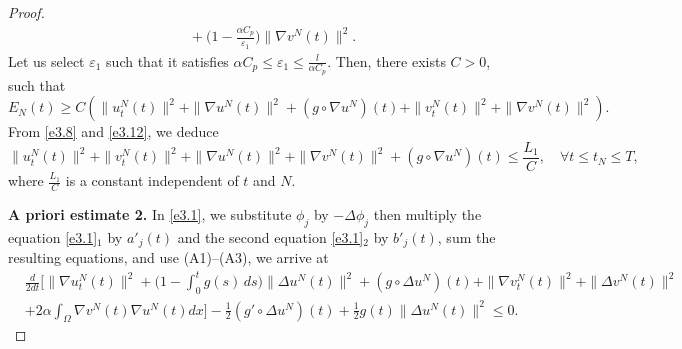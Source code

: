 \documentclass[11pt]{article}
\numberwithin{equation}{section}
\begin{document}
\begin{proof}
\begin{equation}
\begin{aligned}
 &\quad +\Big( 1-\frac{\alpha C_p}{\varepsilon_{1}}\Big) \| \nabla v^N(t) \|^2.
\end{aligned}\label{e3.13}
\end{equation}
Let us select $\varepsilon_{1}$ such that it satisfies
$\alpha C_p \leq \varepsilon_{1}\leq \frac{l}{\alpha C_p}$.
Then, there exists $C>0$, such that
\begin{equation}
E_N(t)\geq C\left( \| u^N_{t}(t) \|^2 + \| \nabla u^N (t)\|^2
+(g\circ\nabla u^N)(t)+\| v^N_{t}(t) \|^2 + \| \nabla v^N (t)\|^2\right).\label{e3.14}
\end{equation}
From \eqref{e3.8} and \eqref{e3.12}, we deduce
\begin{equation}
\| u^N_{t}(t) \|^2 +\| v^N_{t}(t) \|^2 + \| \nabla u^N(t) \|^2
+ \| \nabla v^N (t)\|^2 +(g\circ\nabla u^N)(t)\leq \frac{L_{1}}{C},\quad
\forall t\leq t_{N}\leq T,
\label{e3.15}
\end{equation}
where $\frac{L_{1}}{C}$ is a constant independent of $t$ and $N$.
\smallskip

\noindent\textbf{A priori estimate 2.}
In \eqref{e3.1}, we substitute $\phi_j $ by $ -\Delta \phi_j$ then
multiply the equation \eqref{e3.1}$_1$ by $a'_j(t)$ and the second equation
\eqref{e3.1}$_2$ by $b'_j(t)$, sum the resulting equations, and use
(A1)--(A3), we arrive at
\begin{align*}
&\frac{d}{2dt}\Big[ \| \nabla u^N_{t}(t) \|^2
+\Big( 1 - \int_0^t g(s)\,ds \Big) \| \Delta u^N(t) \|^2
+ (g \circ \Delta u^N)(t) + \| \nabla v^N_{t}(t) \|^2
+ \| \Delta v^N(t) \|^2 \\
& +2 \alpha \int_{\Omega} \nabla v^N(t) \nabla u^N(t) dx\Big]
-\frac{1}{2} \left( g' \circ \Delta u^N \right)(t)
+\frac{1}{2} g(t) \| \Delta u^N(t) \|^2\leq 0.
\end{align*}


\end{proof}
\end{document}
